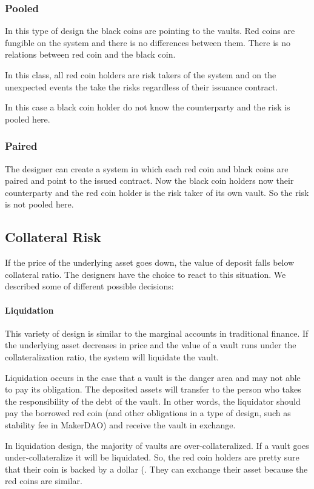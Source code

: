 \subsubsection{Pooled}

In this type of design the black coins are pointing to the vaults. Red coins are fungible on the system and there is no differences between them. There is no relations between red coin and the black coin. 

In this class, all red coin holders are risk takers of the system and on the unexpected events the take the risks regardless of their issuance contract.

In this case a black coin holder do not know the counterparty and the risk is pooled here.

\subsubsection{Paired}

The designer can create a system in which each red coin and black coins are paired and point to the issued contract. Now the black coin holders now their counterparty and the red coin holder is the risk taker of its own vault. So the risk is not pooled here.
\subsection{Collateral Risk}
If the price of the underlying asset goes down, the value of deposit falls below collateral ratio. The designers have the choice to react to this situation. We described some of different possible decisions:

\paragraph{Liquidation}
This variety of design is similar to the marginal accounts in traditional finance. If the underlying asset decreases in price and the value of a vault runs under the collateralization ratio, the system will liquidate the vault.

Liquidation occurs in the case that a vault is the danger area and may not able to pay its obligation. The deposited assets will transfer to the person who takes the responsibility of the debt of the vault. In other words, the liquidator should pay the borrowed red coin (and other obligations in a type of design, such as stability fee in MakerDAO) and receive the vault in exchange.


In liquidation design, the majority of vaults are over-collateralized. If a vault goes under-collateralize it will be liquidated. So, the red coin holders are pretty sure that their coin is backed by a dollar (. They can exchange their asset because the red coins are similar.

